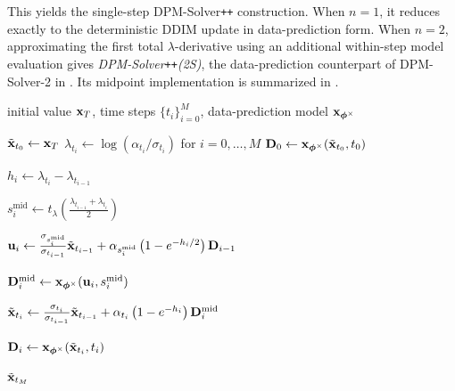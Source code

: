 This yields the single-step DPM-Solver\texttt{++} construction. When $n=1$,
it reduces exactly to the deterministic DDIM update in data-prediction form.
When $n=2$, approximating the first total $\lambda$-derivative using an
additional within-step model evaluation gives
\emph{DPM-Solver\texttt{++}(2S)}, the data-prediction counterpart of
DPM-Solver-2 in . Its midpoint implementation is
summarized in .
\begin{algorithm}[H]
    \centering
    \caption{DPM-Solver\texttt{++}(2S): a midpoint special case.}
    \label{alg:dpmpp-2s-mid}
    \begin{algorithmic}[1]
    \Require initial value ${\mathbf{x}}_T$, time steps $\{t_i\}_{i=0}^M$,
    data-prediction model ${\mathbf{x}}_{{\bm{\phi}}^\times}$

    \State $\tilde{{\mathbf{x}}}_{t_0}\gets{\mathbf{x}}_T$
    \State $\lambda_{t_i}\gets\log(\alpha_{t_i}/\sigma_{t_i})$
    for $i=0,\ldots,M$
    \State
    ${\mathbf{D}}_0
    \gets
    {\mathbf{x}}_{{\bm{\phi}}^\times}(\tilde{{\mathbf{x}}}_{t_0},t_0)$

        \State
        $h_i
        \gets
        \lambda_{t_i}-\lambda_{t_{i-1}}$

        \State
        $s_i^{\mathrm{mid}}
        \gets
        t_\lambda
        \left(
        \tfrac{\lambda_{t_{i-1}}+\lambda_{t_i}}{2}
        \right)$

        \State
        ${\mathbf{u}}_i
        \gets
        \tfrac{\sigma_{s_i^{\mathrm{mid}}}}{\sigma_{t_{i-1}}}
        \tilde{{\mathbf{x}}}_{t_{i-1}}
        +
        \alpha_{s_i^{\mathrm{mid}}}
        \left(
        1-e^{-h_i/2}
        \right)
        {\mathbf{D}}_{i-1}$

        \State
        ${\mathbf{D}}_i^{\mathrm{mid}}
        \gets
        {\mathbf{x}}_{{\bm{\phi}}^\times}
        ({\mathbf{u}}_i,s_i^{\mathrm{mid}})$

        \State
        $\tilde{{\mathbf{x}}}_{t_i}
        \gets
        \tfrac{\sigma_{t_i}}{\sigma_{t_{i-1}}}
        \tilde{{\mathbf{x}}}_{t_{i-1}}
        +
        \alpha_{t_i}
        \left(
        1-e^{-h_i}
        \right)
        {\mathbf{D}}_i^{\mathrm{mid}}$

            \State
            ${\mathbf{D}}_i
            \gets
            {\mathbf{x}}_{{\bm{\phi}}^\times}
            (\tilde{{\mathbf{x}}}_{t_i},t_i)$
        \EndIf
    \EndFor

    \State \Return $\tilde{{\mathbf{x}}}_{t_M}$
    \end{algorithmic}
\end{algorithm}


